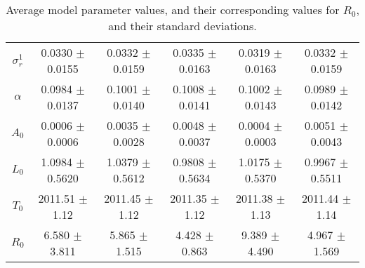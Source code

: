 \begin{sidewaystable}
\begin{tabular}{cccccc}
{\bf $\sigma^1_r$} & 0.0330 $\pm$ 0.0155 & 0.0332 $\pm$ 0.0159 & 0.0335 $\pm$ 0.0163 & 0.0319 $\pm$ 0.0163 & 0.0332 $\pm$ 0.0159 \\
{\bf $\alpha$} & 0.0984 $\pm$ 0.0137 & 0.1001 $\pm$ 0.0140 & 0.1008 $\pm$ 0.0141 & 0.1002 $\pm$ 0.0143 & 0.0989 $\pm$ 0.0142 \\
{\bf $A_0$} & 0.0006 $\pm$ 0.0006 & 0.0035 $\pm$ 0.0028 & 0.0048 $\pm$ 0.0037 & 0.0004 $\pm$ 0.0003 & 0.0051 $\pm$ 0.0043 \\
{\bf $L_0$} & 1.0984 $\pm$ 0.5620 & 1.0379 $\pm$ 0.5612 & 0.9808 $\pm$ 0.5634 & 1.0175 $\pm$ 0.5370 & 0.9967 $\pm$ 0.5511 \\
{\bf $T_0$} & 2011.51 $\pm$ 1.12 & 2011.45 $\pm$ 1.12 & 2011.35 $\pm$ 1.12 & 2011.38 $\pm$ 1.13 & 2011.44 $\pm$ 1.14 \\
{\bf $R_0$} & 6.580 $\pm$ 3.811& 5.865 $\pm$ 1.515 & 4.428 $\pm$ 0.863& 9.389 $\pm$ 4.490& 4.967 $\pm$ 1.569\\
\hline\hline
\end{tabular}
\caption{Average model parameter values, and their corresponding values for $R_0$,  and their standard deviations.}
\label{Table:Parameter_Values}
\end{sidewaystable}
